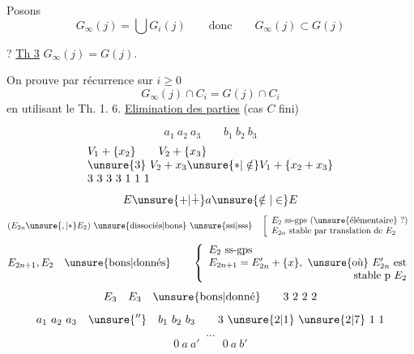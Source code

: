 Posons
\[
G_\infty(j)=\bigcup G_i(j)\qquad\text{donc}\qquad G_\infty(j)\subset G(j)
\]

? \uline{Th 3} $G_\infty(j)=G(j)$.



On prouve par récurrence sur $i\geq0$
\[
G_\infty(j)\cap C_i=G(j)\cap C_i
\]
en utilisant le Th. 1.
6. \uline{Elimination des parties}  (cas $C$ fini)

\[
a_1\ a_2\ a_3\qquad b_1\ b_2\ b_3
\]
\[
\begin{array}{l}
V_1+\{x_2\}\qquad V_2+\{x_3\}\\
\unsure{3}\ V_2+x_3\unsure{\ast|\notin}V_1+\{x_2+x_3\}\\
3\ 3\ 3\ 3\ 1\ 1\ 1
\end{array}
\]
\[
E\unsure{+|\dotplus}a\unsure{\notin|\in}E
\]
\[
(E_{2n}\unsure{,|\ast}E_2)\ \text{\unsure{dissociés|bons}}\ \text{\unsure{ssi|sss}}\quad
\left[\begin{array}{l}
E_2\text{ ss-gps (\unsure{élémentaire} ?)}\\
E_{2n}\text{ stable par translation de }E_2
\end{array}\right.
\]
\[
E_{2n+1},E_2\quad\text{\unsure{bons|donnés}}\qquad
\left\{\begin{array}{l}
E_2\text{ ss-gps}\\
E_{2n+1}=E'_{2n}+\{x\},\ \text{\unsure{où}}\ E'_{2n}\text{ est}\\
\hfill\text{stable p }E_2
\end{array}\right.
\]
\[
E_3\quad E_3\quad\text{\unsure{bons|donné}}\qquad 3\ 2\ 2\ 2
\]
\[
a_1\ a_2\ a_3\quad\unsure{''}\quad b_1\ b_2\ b_3\qquad 3\ \unsure{2|1}\ \unsure{2|7}\ 1\ 1
\]
\[
\cdots
\]
\[
0\ a\ a'\qquad 0\ a\ b'
\]

